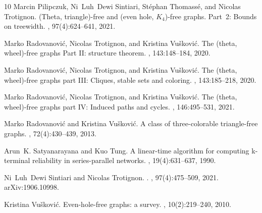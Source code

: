 \documentclass[11pt]{article}
\begin{document}
\begin{thebibliography}{10}
Marcin Pilipczuk, Ni~Luh~Dewi Sintiari, St{\'{e}}phan Thomass{\'{e}}, and
  Nicolas Trotignon.
\newblock ({T}heta, triangle)-free and (even hole, \({K}_{\mbox{4}}\))-free
  graphs. {P}art~2: Bounds on treewidth.
, 97(4):624--641, 2021.

Marko Radovanovi{\'c}, Nicolas Trotignon, and Kristina Vu{\v s}kovi{\'c}.
\newblock The (theta, wheel)-free graphs {P}art {II:} structure theorem.
, 143:148--184,
  2020.

Marko Radovanovi{\' c}, Nicolas Trotignon, and Kristina Vu{\v s}kovi{\'c}.
\newblock The (theta, wheel)-free graphs part {III:} {C}liques, stable sets and
  coloring.
, 143:185--218,
  2020.

Marko Radovanovi{\' c}, Nicolas Trotignon, and Kristina Vu{\v s}kovi{\'c}.
\newblock The (theta, wheel)-free graphs part {IV:} {I}nduced paths and cycles.
, 146:495--531,
  2021.

Marko Radovanovi{\'c} and Kristina Vu{\v s}kovi{\'c}.
\newblock A class of three-colorable triangle-free graphs.
, 72(4):430--439, 2013.

Arun~K. Satyanarayana and Kuo Tung.
\newblock A linear-time algorithm for computing k-terminal reliability in
  series-parallel networks.
, 19(4):631--637, 1990.

Ni~Luh~Dewi Sintiari and Nicolas Trotignon.
.
, 97(4):475--509, 2021.
\newblock arXiv:1906.10998.

Kristina Vu{\v s}kovi{\'c}.
\newblock Even-hole-free graphs: a survey.
, 10(2):219--240,
  2010.

\end{thebibliography}
\end{document}
